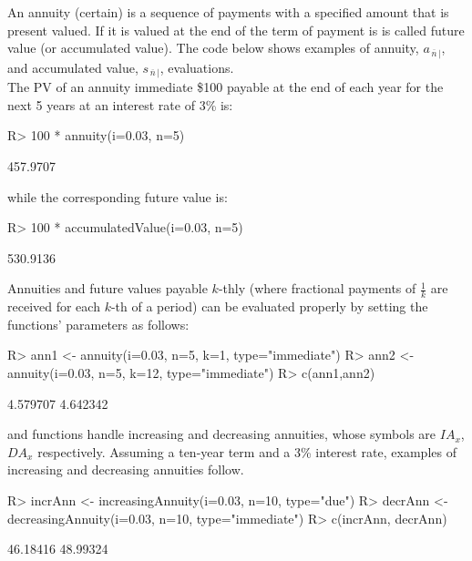 \documentclass[nojss]{jss}
\begin{document}
An annuity (certain) is a sequence of payments with a specified amount that is
present valued. If it is valued at the end of the term of payment
is is called future value (or accumulated value). The code below shows examples of annuity, $a_{\left.
{\overline {\, n \,}}\! \right| }$, and accumulated value, $s_{\left. {\overline {\, n \,}}\! \right| }$,  evaluations.\\
The PV of an annuity immediate \$100 payable at the end of each year for the next 5 years at an interest rate of 3\% is: 
\begin{Schunk}
\begin{Sinput}
R> 100 * annuity(i=0.03, n=5)
\end{Sinput}
\begin{Soutput}
[1] 457.9707
\end{Soutput}
\end{Schunk}
while the corresponding future value is:
\begin{Schunk}
\begin{Sinput}
R> 100 * accumulatedValue(i=0.03, n=5)
\end{Sinput}
\begin{Soutput}
[1] 530.9136
\end{Soutput}
\end{Schunk}

Annuities and future values payable $k$-thly (where fractional payments of $\frac{1}{k}$
are received for each $k$-th of a period) can be evaluated properly by setting the
functions' parameters as follows:

\begin{Schunk}
\begin{Sinput}
R> ann1 <- annuity(i=0.03, n=5, k=1, type="immediate")
R> ann2 <- annuity(i=0.03, n=5, k=12, type="immediate")
R> c(ann1,ann2)
\end{Sinput}
\begin{Soutput}
[1] 4.579707 4.642342
\end{Soutput}
\end{Schunk}




 and  functions handle
increasing and decreasing annuities, whose symbols are $IA_{x}$, $DA_{x}$
respectively. Assuming a ten-year term and a 3\% interest rate,
examples of increasing and decreasing annuities follow.
\begin{Schunk}
\begin{Sinput}
R> incrAnn <- increasingAnnuity(i=0.03, n=10, type="due")
R> decrAnn <- decreasingAnnuity(i=0.03, n=10, type="immediate")
R> c(incrAnn, decrAnn)
\end{Sinput}
\begin{Soutput}
[1] 46.18416 48.99324
\end{Soutput}
\end{Schunk}
\end{document}
